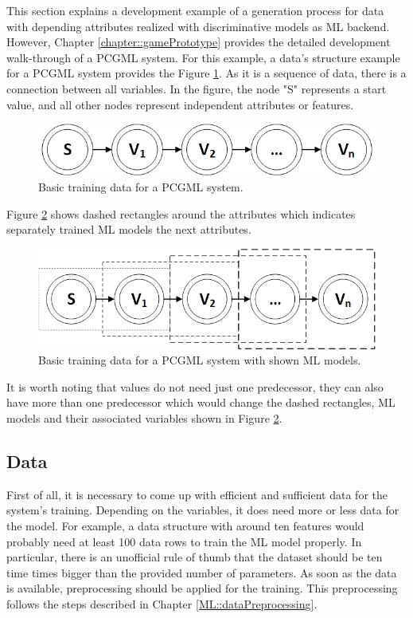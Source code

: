 \documentclass[MGS,Master,english]{twbook}%
\begin{document}
This section explains a development example of a generation process for data with depending attributes realized with discriminative models as ML backend. However, Chapter \ref{chapter::gamePrototype} provides the detailed development walk-through of a PCGML system. For this example, a data’s structure example for a PCGML system provides the Figure \ref{fig::PCGML::devExample::sequenceBase}. As it is a sequence of data, there is a connection between all variables. In the figure, the node "S" represents a start value, and all other nodes represent independent attributes or features. 
\begin{figure}[!htbp]
	\centering
	\includegraphics[width=0.5\linewidth]{PICs/PCGML_development_example_sequence_base}
	\caption{Basic training data for a PCGML system. }\label{fig::PCGML::devExample::sequenceBase}
\end{figure}
Figure \ref{fig::PCGML::devExample::sequenceWithModels} shows dashed rectangles around the attributes which indicates separately trained ML models the next attributes. 
\begin{figure}[!htbp]
	\centering
	\includegraphics[width=0.55\linewidth]{PICs/PCGML_development_example_sequence_with_models}
	\caption{Basic training data for a PCGML system with shown ML models.}\label{fig::PCGML::devExample::sequenceWithModels}
\end{figure}
It is worth noting that values do not need just one predecessor, they can also have more than one predecessor which would change the dashed rectangles, ML models and their associated variables shown in Figure \ref{fig::PCGML::devExample::sequenceWithModels}.

\subsection{Data}
First of all, it is necessary to come up with efficient and sufficient data for the system’s training. Depending on the variables, it does need more or less data for the model. For example, a data structure with around ten features would probably need at least 100 data rows to train the ML model properly. In particular, there is an unofficial rule of thumb that the dataset should be ten time times bigger than the provided number of parameters. As soon as the data is available, preprocessing should be applied for the training. This preprocessing follows the steps described in Chapter \ref{ML::dataPreprocessing}.
\end{document}
